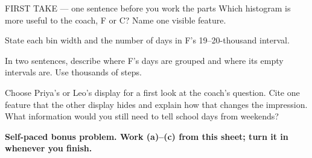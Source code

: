 \documentclass[14pt]{extarticle}
\begin{document}
\begin{firsttakebox}{FIRST TAKE --- one sentence before you work the parts}
Which histogram is more useful to the coach, F or C? Name one visible feature.
\end{firsttakebox}

\begin{description}[leftmargin=1.15in, labelwidth=1in, itemsep=2pt, topsep=2pt]
  \item[\dokbadge{1}~(a)] State each bin width and the number of days in F's 19--20-thousand interval.
  \item[\dokbadge{2}~(b)] In two sentences, describe where F's days are grouped and where its empty intervals are. Use thousands of steps.
  \item[\dokbadge{3}~(c)] Choose Priya's or Leo's display for a first look at the coach's question. Cite one feature that the other display hides and explain how that changes the impression. What information would you still need to tell school days from weekends?
\end{description}

\vfill
\textbf{Self-paced bonus problem. Work (a)--(c) from this sheet; turn it in whenever you finish.}
\end{document}
